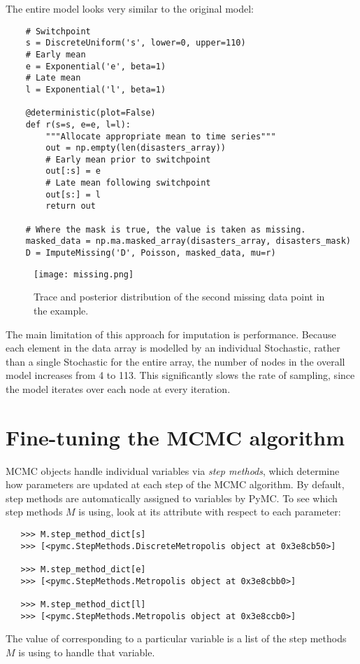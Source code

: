 The entire model looks very similar to the original model:

\begin{verbatim}
	# Switchpoint
	s = DiscreteUniform('s', lower=0, upper=110)   
	# Early mean
	e = Exponential('e', beta=1)
	# Late mean
	l = Exponential('l', beta=1)   

	@deterministic(plot=False)
	def r(s=s, e=e, l=l):
	    """Allocate appropriate mean to time series"""
	    out = np.empty(len(disasters_array))
	    # Early mean prior to switchpoint
	    out[:s] = e
	    # Late mean following switchpoint
	    out[s:] = l
	    return out

	# Where the mask is true, the value is taken as missing. 
	masked_data = np.ma.masked_array(disasters_array, disasters_mask)
	D = ImputeMissing('D', Poisson, masked_data, mu=r)
\end{verbatim}

\begin{figure}[ht]
\begin{center}
\texttt{[image: missing.png]}
\caption{Trace and posterior distribution of the second missing data point in the example.}
\label{fig:missing}
\end{center}
\end{figure}

The main limitation of this approach for imputation is performance. Because each element in the data array is modelled by an individual Stochastic, rather than a single Stochastic for the entire array, the number of nodes in the overall model increases from 4 to 113. This significantly slows the rate of sampling, since the model iterates over each node at every iteration.



\section{Fine-tuning the MCMC algorithm} 

MCMC objects handle individual variables via \emph{step methods}, which determine how parameters are updated at each step of the MCMC algorithm. By default, step methods are automatically assigned to variables by PyMC. To see which step methods $M$ is using, look at its  attribute with respect to each parameter:
\begin{verbatim}
   >>> M.step_method_dict[s]
   >>> [<pymc.StepMethods.DiscreteMetropolis object at 0x3e8cb50>]
   
   >>> M.step_method_dict[e]
   >>> [<pymc.StepMethods.Metropolis object at 0x3e8cbb0>]

   >>> M.step_method_dict[l]
   >>> [<pymc.StepMethods.Metropolis object at 0x3e8ccb0>]
\end{verbatim}
The value of  corresponding to a particular variable is a list of the step methods $M$ is using to handle that variable. 

